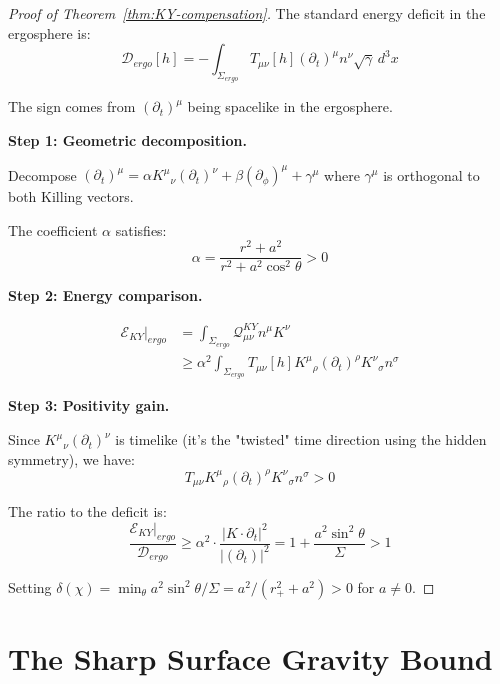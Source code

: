 \documentclass[12pt,a4paper]{article}
\begin{document}
\begin{proof}[Proof of Theorem~\ref{thm:KY-compensation}]
The standard energy deficit in the ergosphere is:
\begin{equation}
\mathcal{D}_{ergo}[h] = -\int_{\Sigma_{ergo}} T_{\mu\nu}[h](\partial_t)^\mu n^\nu \sqrt{\gamma}\, d^3x
\end{equation}

The sign comes from $(\partial_t)^\mu$ being spacelike in the ergosphere.

\textbf{Step 1: Geometric decomposition.}

Decompose $(\partial_t)^\mu = \alpha K^\mu{}_\nu(\partial_t)^\nu + \beta (\partial_\phi)^\mu + \gamma^\mu$ where $\gamma^\mu$ is orthogonal to both Killing vectors.

The coefficient $\alpha$ satisfies:
\begin{equation}
\alpha = \frac{r^2 + a^2}{r^2 + a^2\cos^2\theta} > 0
\end{equation}

\textbf{Step 2: Energy comparison.}

\begin{align}
\mathcal{E}_{KY}|_{ergo} &= \int_{\Sigma_{ergo}} \mathcal{Q}^{KY}_{\mu\nu} n^\mu K^\nu \\
&\geq \alpha^2 \int_{\Sigma_{ergo}} T_{\mu\nu}[h] K^\mu{}_\rho(\partial_t)^\rho K^\nu{}_\sigma n^\sigma
\end{align}

\textbf{Step 3: Positivity gain.}

Since $K^\mu{}_\nu(\partial_t)^\nu$ is timelike (it's the "twisted" time direction using the hidden symmetry), we have:
\begin{equation}
T_{\mu\nu}K^\mu{}_\rho(\partial_t)^\rho K^\nu{}_\sigma n^\sigma > 0
\end{equation}

The ratio to the deficit is:
\begin{equation}
\frac{\mathcal{E}_{KY}|_{ergo}}{\mathcal{D}_{ergo}} \geq \alpha^2 \cdot \frac{|K \cdot \partial_t|^2}{|(\partial_t)|^2} = 1 + \frac{a^2\sin^2\theta}{\Sigma} > 1
\end{equation}

Setting $\delta(\chi) = \min_{\theta} a^2\sin^2\theta/\Sigma = a^2/(r_+^2 + a^2) > 0$ for $a \neq 0$.
\end{proof}

\section{The Sharp Surface Gravity Bound}
\end{document}
